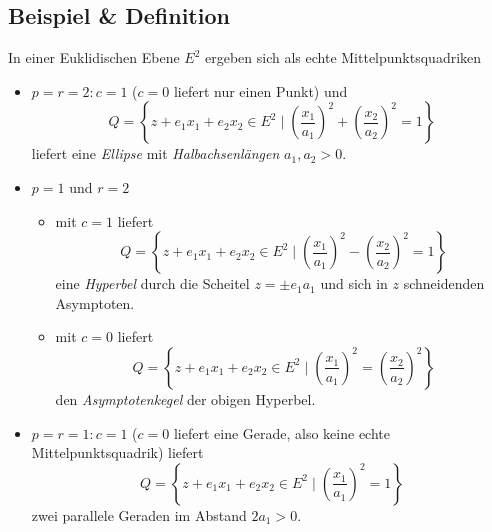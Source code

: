 \subsection{Beispiel \& Definition}
	In einer Euklidischen Ebene $ E^2 $ ergeben sich als echte Mittelpunktsquadriken
		\begin{itemize}
			\item $ p=r=2 : c=1 $ ($ c=0 $ liefert nur einen Punkt) und
				\[ Q=\left\{z+e_1x_1+e_2x_2\in E^2\mid \left(\frac{x_1}{a_1}\right)^2+\left(\frac{x_2}{a_2}\right)^2 = 1\right\} \]
				liefert eine \emph{Ellipse} mit \emph{Halbachsenlängen} $ a_1,a_2 > 0$.
			\item $ p=1 $ und $ r=2 $
				\begin{itemize}
					\item mit $ c=1 $ liefert
						\[ Q=\left\{z+e_1x_1+e_2x_2\in E^2\mid \left(\frac{x_1}{a_1}\right)^2-\left(\frac{x_2}{a_2}\right)^2 = 1\right\} \]
						eine \emph{Hyperbel} durch die Scheitel $ z=\pm e_1a_1 $ und sich in $ z $ schneidenden Asymptoten.
	        \begin{figure}[H]\centering
     		    
    	    \end{figure}
   
					\item mit $ c=0 $ liefert
						\[ Q=\left\{z+e_1x_1+e_2x_2\in E^2\mid \left(\frac{x_1}{a_1}\right)^2=\left(\frac{x_2}{a_2}\right)^2 \right\} \]
						den \emph{Asymptotenkegel} der obigen Hyperbel.
				\end{itemize}
			\item $ p=r=1 : c=1 $ ($ c=0 $ liefert eine Gerade, also keine echte Mittelpunktsquadrik) liefert
				\[ Q=\left\{z+e_1x_1+e_2x_2\in E^2\mid \left(\frac{x_1}{a_1}\right)^2 = 1\right\} \]
			zwei parallele Geraden im Abstand $ 2a_1 > 0$.
		\end{itemize}
	